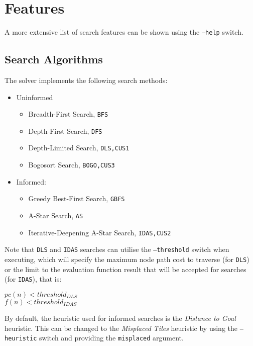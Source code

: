 \section{Features}
\label{sec:Features}

A more extensive list of search features can be shown using the \texttt{--help}
switch.

\subsection{Search Algorithms}
\label{sub:Search Algorithms}

The solver implements the following search methods:

\begin{itemize}
  \item Uninformed
  \begin{itemize}
    \item Breadth-First Search, \texttt{BFS}
    \item Depth-First Search, \texttt{DFS}
    \item Depth-Limited Search, \texttt{DLS,CUS1}
    \item Bogosort Search, \texttt{BOGO,CUS3}
  \end{itemize}
  \item Informed:
  \begin{itemize}
    \item Greedy Best-First Search, \texttt{GBFS}
    \item A-Star Search, \texttt{AS}
    \item Iterative-Deepening A-Star Search, \texttt{IDAS,CUS2}
  \end{itemize}
\end{itemize}

Note that \texttt{DLS} and \texttt{IDAS} searches can utilise the
\texttt{--threshold} switch when executing, which will specify the
maximum node path cost to traverse (for \texttt{DLS}) or the limit
to the evaluation function result that will be accepted for searches
(for \texttt{IDAS}), that is:

\begin{center}
  \vspace{1em}
  \noindent
  $pc(n) < threshold_{DLS}$
  \\
  $f(n) < threshold_{IDAS}$
  \vspace{1em}
\end{center}

By default, the heuristic used for informed searches is the \emph{Distance to
Goal} heuristic. This can be changed to the \emph{Misplaced Tiles} heuristic by
using the \texttt{--heuristic} switch and providing the \texttt{misplaced}
argument.


